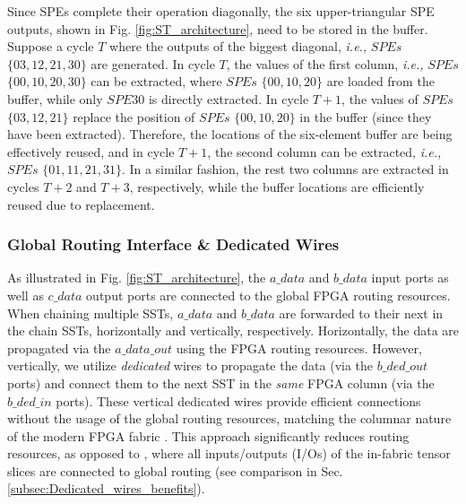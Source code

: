 Since SPEs complete their operation diagonally, the six upper-triangular SPE outputs, shown in Fig. \ref{fig:ST_architecture}, need to be stored in the buffer.
Suppose a cycle $T$ where the outputs of the biggest diagonal, \emph{i.e.,} $SPEs$ $\{03, 12, 21, 30\}$ are generated.
In cycle $T$, the values of the first column, \emph{i.e.,} $SPEs$ $\{00, 10, 20, 30\}$ can be extracted, where $SPEs$ $\{00, 10, 20\}$ are loaded from the buffer, while only $SPE30$ is directly extracted.
In cycle $T + 1$, the values of $SPEs$ $\{03, 12, 21\}$ replace the position of $SPEs$ $\{00, 10, 20\}$ in the buffer (since they have been extracted).
Therefore, the locations of the six-element buffer are being effectively reused, and in cycle $T+1$, the second column can be extracted, \emph{i.e.,} $SPEs$ $\{01, 11, 21, 31\}$.
In a similar fashion, the rest two columns are extracted in cycles $T+2$ and $T+3$, respectively, while the buffer locations are efficiently reused due to replacement. 








\subsubsection{Global Routing Interface \& Dedicated Wires}

As illustrated in Fig. \ref{fig:ST_architecture}, the $a\_data$ and $b\_data$ input ports as well as $c\_data$ output ports are connected to the global FPGA routing resources.
When chaining multiple SSTs, $a\_data$ and $b\_data$ are forwarded to their next in the chain SSTs, horizontally and vertically, respectively.
Horizontally, the data are propagated via the $a\_data\_out$ using the FPGA routing resources.
However, vertically, we utilize \textit{dedicated} wires to propagate the data (via the $b\_ded\_out$ ports) and connect them to the next SST in the \textit{same} FPGA column (via the $b\_ded\_in$ ports).
These vertical dedicated wires provide efficient connections without the usage of the global routing resources, matching the columnar nature of the modern FPGA fabric \cite{FPGA_architecture_2021, FPGA_for_DL_2024}.
This approach significantly reduces routing resources, as opposed to  \cite{TS_Aman_FPGA_2021, Aman_TS_TRETS_2022}, where all inputs/outputs (I/Os) of the in-fabric tensor slices are connected to global routing (see comparison in Sec. \ref{subsec:Dedicated_wires_benefits}).




